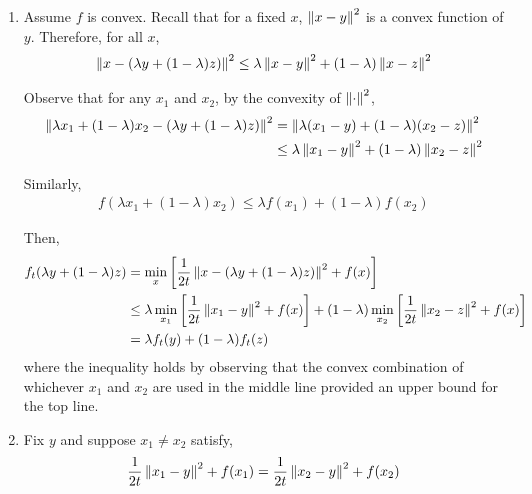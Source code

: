 \documentclass[10pt]{article}
\begin{document}
\begin{solution}[Solution]
\begin{enumerate}[label=(\alph*)]
    \item Assume \( f \) is convex. Recall that for a fixed \( x \), \( \left\lVert x-y\right\rVert^2 \) is a convex function of \( y \). Therefore, for all \( x \), 
        \begin{align*}
            \left\lVert x-(\lambda y + (1-\lambda)z)\right\rVert^2
            \leq \lambda \left\lVert x-y\right\rVert^2 + (1-\lambda)\left\lVert x-z\right\rVert^2
        \end{align*}

        Observe that for any \( x_1 \) and \( x_2 \), by the convexity of \( \left\lVert\cdot\right\rVert^2 \), 
        \begin{align*}
            \left\lVert \lambda x_1 + (1-\lambda)x_2 - (\lambda y + (1-\lambda)z)\right\rVert ^2
            &= \left\lVert\lambda(x_1-y) + (1-\lambda)(x_2-z)\right\rVert^2
            \\&\leq \lambda \left\lVert x_1-y\right\rVert^2 + (1-\lambda)\left\lVert x_2-z\right\rVert^2
        \end{align*}

        Similarly,
        \begin{align*}
            f(\lambda x_1 + (1-\lambda)x_2) \leq \lambda f(x_1) + (1-\lambda)f(x_2)
        \end{align*}
        
        Then, 
        \begin{align*}
            f_t(\lambda y + (1-\lambda)z)
            &= \min_x \left[ \frac{1}{2t} \norm{x-(\lambda y + (1-\lambda) z)}^2 + f(x) \right]
            \\&\leq \lambda \min_{x_1} \left[ \frac{1}{2t} \norm{x_1 - y}^2 + f(x) \right] + (1-\lambda) \min_{x_2} \left[\frac{1}{2t}\norm{x_2- z}^2 + f(x) \right]
            \\&= \lambda f_t(y) + (1-\lambda)f_t(z) %
        \end{align*}
        where the inequality holds by observing that the convex combination of whichever \( x_1 \) and \( x_2 \) are used in the middle line provided an upper bound for the top line.

    \item Fix \( y \) and suppose \( x_1 \neq x_2 \) satisfy,
        \begin{align*}
            \frac{1}{2t} \left\lVert x_1-y\right\rVert^2 + f(x_1) = \frac{1}{2t}\left\lVert x_2-y\right\rVert^2 + f(x_2)
        \end{align*}


\end{enumerate}
\end{solution}
\end{document}

